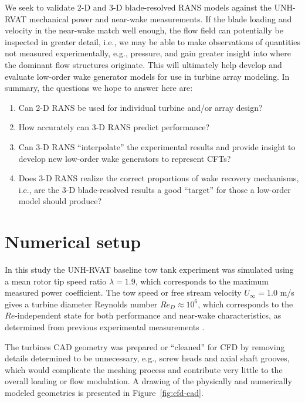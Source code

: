 We seek to validate 2-D and 3-D blade-resolved RANS models against the UNH-RVAT
mechanical power and near-wake measurements. If the blade loading and velocity
in the near-wake match well enough, the flow field can potentially be inspected
in greater detail, i.e., we may be able to make observations of quantities not
measured experimentally, e.g., pressure, and gain greater insight into where the
dominant flow structures originate. This will ultimately help develop and
evaluate low-order wake generator models for use in turbine array modeling. In
summary, the questions we hope to answer here are:

\begin{enumerate}
    \item Can 2-D RANS be used for individual turbine and/or array design?

    \item How accurately can 3-D RANS predict performance?

    \item Can 3-D RANS ``interpolate'' the experimental results and provide
    insight to develop new low-order wake generators to represent CFTs?

    \item Does 3-D RANS realize the correct proportions of wake recovery
    mechanisms, i.e., are the 3-D blade-resolved results a good ``target'' for
    those a low-order model should produce?
\end{enumerate}


\section{Numerical setup}

In this study the UNH-RVAT baseline tow tank experiment was simulated using a
mean rotor tip speed ratio $\lambda=1.9$, which corresponds to the maximum
measured power coefficient. The tow speed or free stream velocity $U_\infty=1.0$
m/s gives a turbine diameter Reynolds number $Re_D \approx 10^6$, which
corresponds to the $Re$-independent state for both performance and near-wake
characteristics, as determined from previous experimental measurements
\cite{Bachant2014, Bachant2016-Energies}.

The turbines CAD geometry was prepared or ``cleaned'' for CFD by removing
details determined to be unnecessary, e.g., screw heads and axial shaft grooves,
which would complicate the meshing process and contribute very little to the
overall loading or flow modulation. A drawing of the physically and numerically
modeled geometries is presented in Figure~\ref{fig:cfd-cad}.

